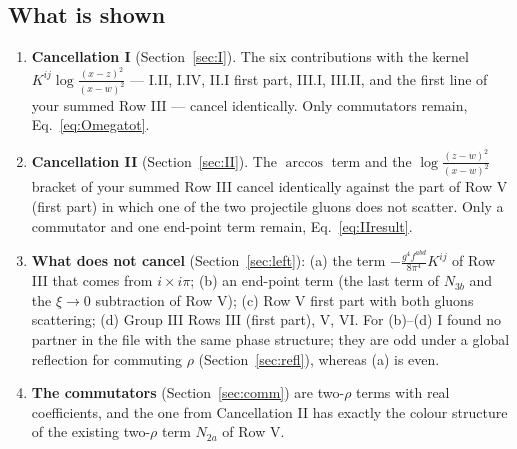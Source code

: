 \documentclass[10pt]{article}
\numberwithin{equation}{section}
\begin{document}
\subsection{What is shown}
\begin{enumerate}
\item \textbf{Cancellation I} (Section~\ref{sec:I}). The six contributions with the kernel $K^{ij}\log\frac{(x-z)^{2}}{(x-w)^{2}}$ --- I.II, I.IV, II.I first part, III.I, III.II, and the first line of your summed Row III --- cancel identically. Only commutators remain, Eq.~\eqref{eq:Omegatot}.
\item \textbf{Cancellation II} (Section~\ref{sec:II}). The $\arccos$ term and the $\log\frac{(z-w)^{2}}{(x-w)^{2}}$ bracket of your summed Row III cancel identically against the part of Row V (first part) in which one of the two projectile gluons does not scatter. Only a commutator and one end-point term remain, Eq.~\eqref{eq:IIresult}.
\item \textbf{What does not cancel} (Section~\ref{sec:left}): (a) the term $-\frac{g^{4}f^{abd}}{8\pi^{4}}K^{ij}$ of Row III that comes from $i\times i\pi$; (b) an end-point term (the last term of $N_{3b}$ and the $\xi\to0$ subtraction of Row V); (c) Row V first part with both gluons scattering; (d) Group III Rows III (first part), V, VI. For (b)--(d) I found no partner in the file with the same phase structure; they are odd under a global reflection for commuting $\rho$ (Section~\ref{sec:refl}), whereas (a) is even.
\item \textbf{The commutators} (Section~\ref{sec:comm}) are two-$\rho$ terms with real coefficients, and the one from Cancellation II has exactly the colour structure of the existing two-$\rho$ term $N_{2a}$ of Row V.
\end{enumerate}
\end{document}
